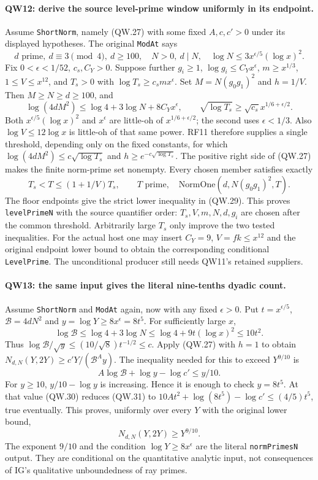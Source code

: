 \paragraph{QW12: derive the source level-prime window uniformly in its endpoint.}
Assume \texttt{ShortNorm}, namely (QW.27) with some fixed $A,c,c'>0$
under its displayed hypotheses. The original \texttt{ModAt} says
\[
 d\text{ prime},\ d\equiv3\pmod4,\ d\ge100,\quad
 N>0,\ d\mid N,\quad \log N\le3x^{\epsilon/5}(\log x)^2.       \tag{QW.28}
\]
Fix $0<\epsilon<1/52$, $c_s,C_Y>0$. Suppose further
$g_i\ge1$, $\log g_i\le C_Yx^\epsilon$, $m\ge x^{1/3}$,
$1\le V\le x^{12}$, and $T_s>0$ with
$\log T_s\ge c_s m x^\epsilon$.
Set $M=N(g_0g_1)^2$ and $h=1/V$. Then $M\ge N\ge d\ge100$, and
\[
 \log(4dM^2)\le\log4+3\log N+8C_Yx^\epsilon,
 \qquad \sqrt{\log T_s}\ge\sqrt{c_s}x^{1/6+\epsilon/2}.
\]
Both $x^{\epsilon/5}(\log x)^2$ and $x^\epsilon$ are little-oh of
$x^{1/6+\epsilon/2}$; the second uses $\epsilon<1/3$.
Also $\log V\le12\log x$ is little-oh of that same power.
RF11 therefore supplies a single threshold, depending only on the fixed
constants, for which
$\log(4dM^2)\le c\sqrt{\log T_s}$ and
$h\ge e^{-c\sqrt{\log T_s}}$.
The positive right side of (QW.27) makes the finite norm-prime set
nonempty. Every chosen member satisfies exactly
\[
 T_s<T\le(1+1/V)T_s,\qquad
 T\text{ prime},\quad \mathrm{NormOne}(d,N(g_0g_1)^2,T).        \tag{QW.29}
\]
The floor endpoints give the strict lower inequality in (QW.29).
This proves \texttt{levelPrimeN} with the source quantifier order:
$T_s,V,m,N,d,g_i$ are chosen after the common threshold. Arbitrarily
large $T_s$ only improve the two tested inequalities. For the actual
host one may insert $C_Y=9$, $V=fk\le x^{12}$ and the original endpoint
lower bound to obtain the corresponding conditional \texttt{LevelPrime}.
The unconditional producer still needs QW11's retained suppliers.

\paragraph{QW13: the same input gives the literal nine-tenths dyadic count.}
Assume \texttt{ShortNorm} and \texttt{ModAt} again, now with any fixed
$\epsilon>0$. Put $t=x^{\epsilon/5}$, $\mathcal B=4dN^2$ and
$y=\log Y\ge8x^\epsilon=8t^5$. For sufficiently large $x$,
\[
 \log\mathcal B\le\log4+3\log N
 \le\log4+9t(\log x)^2\le10t^2.                               \tag{QW.30}
\]
Thus $\log\mathcal B/\sqrt y\le(10/\sqrt8)t^{-1/2}\le c$.
Apply (QW.27) with $h=1$ to obtain
$N_{d,N}(Y,2Y)\ge c'Y/(\mathcal B^A y)$.
The inequality needed for this to exceed $Y^{9/10}$ is
\[
                A\log\mathcal B+\log y-\log c'\le y/10.       \tag{QW.31}
\]
For $y\ge10$, $y/10-\log y$ is increasing. Hence it is enough to
check $y=8t^5$. At that value (QW.30) reduces (QW.31) to
$10At^2+\log(8t^5)-\log c'\le(4/5)t^5$, true eventually.
This proves, uniformly over every $Y$ with the original lower bound,
\[
                         N_{d,N}(Y,2Y)\ge Y^{9/10}.             \tag{QW.32}
\]
The exponent $9/10$ and the condition $\log Y\ge8x^\epsilon$ are
the literal \texttt{normPrimesN} output. They are conditional on the
quantitative analytic input, not consequences of IG's qualitative
unboundedness of ray primes.

